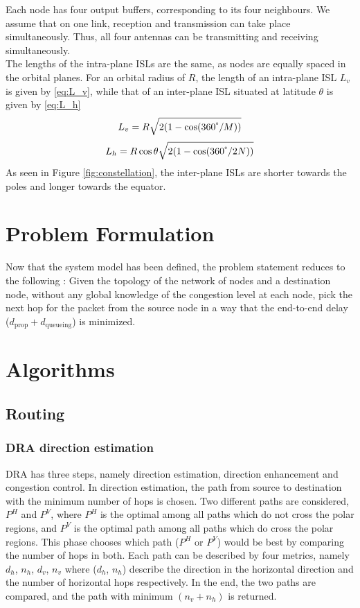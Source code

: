 \documentclass[10pt,conference, final, letterpaper]{IEEEtran}
\begin{document}
Each node has four output buffers, corresponding to its four neighbours. We assume that on one link, reception and transmission can take place simultaneously. Thus, all four antennas can be transmitting and receiving simultaneously.\\
The lengths of the intra-plane ISLs are the same, as nodes are equally spaced in the orbital planes. For an orbital radius of $R$, the length of an intra-plane ISL $L_v$ is given by \eqref{eq:L_v}, while that of an inter-plane ISL situated at latitude $\theta$ is given by \eqref{eq:L_h}
\begin{equation}
\label{eq:L_v}
	L_v = R\sqrt{2(1-\cos(360^\degree/M))}
\end{equation}
\begin{equation}
	\label{eq:L_h}
	L_h = R\cos{\theta}\sqrt{2(1-\cos(360^\degree/2N))}
\end{equation}
As seen in Figure \ref{fig:constellation}, the inter-plane ISLs are shorter towards the poles and longer towards the equator.
\section{Problem Formulation}
Now that the system model has been defined, the problem statement reduces to the following : Given the topology of the network of nodes and a destination node, without any global knowledge of the congestion level at each node, pick the next hop for the packet from the source node in a way that the end-to-end delay ($d_{\text{prop}}+d_{\text{queueing}}$) is minimized.\\
\section{Algorithms}
\subsection{Routing}
\subsubsection{DRA direction estimation}
DRA has three steps, namely direction estimation, direction enhancement and congestion control. In direction estimation, the path from source to destination with the minimum number of hops is chosen. Two different paths are considered, $P^H$ and $P^V$, where $P^H$ is the optimal among all paths which do not cross the polar regions, and $P^V$ is the optimal path among all paths which do cross the polar regions. This phase chooses which path ($P^H$ or $P^V$) would be best by comparing the number of hops in both. Each path can be described by four metrics, namely $d_h$, $n_h$, $d_v$, $n_v$ where ($d_h$, $n_h$) describe the direction in the horizontal direction and the number of horizontal hops respectively. In the end, the two paths are compared, and the path with minimum $(n_v + n_h)$ is returned.\\
\end{document}
